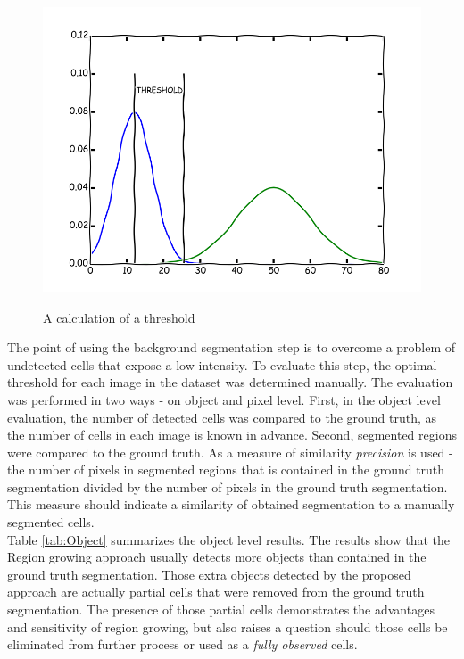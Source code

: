\begin{figure}
	\begin{center}
		\includegraphics[scale=0.4]{Figures/segmentation/approx_hist_thr}
		\label{img:Thr}
		\caption{A calculation of a threshold}
	\end{center}
\end{figure}

The point of using the background segmentation step is to overcome a problem of undetected cells that expose a low intensity. To evaluate this step, the optimal threshold for each image in the dataset was determined manually. The evaluation was performed in two ways - on object and pixel level. First, in the object level evaluation, the number of detected cells was compared to the ground truth, as the number of cells in each image is known in advance. Second, segmented regions were compared to the ground truth. As a measure of similarity \textit{precision} is used - the number of pixels in segmented regions that is contained in the ground truth segmentation divided by the number of pixels in the ground truth segmentation. This measure should indicate a similarity of obtained segmentation to a manually segmented cells. \\

Table \ref{tab:Object} summarizes the object level results. The results show that the Region growing approach usually detects more objects than contained in the ground truth segmentation. Those extra objects detected by the proposed approach are actually partial cells that were removed from the ground truth segmentation. The presence of those partial cells demonstrates the advantages and sensitivity of region growing, but also raises a question should those cells be eliminated from further process or used as a \textit{fully observed} cells.

